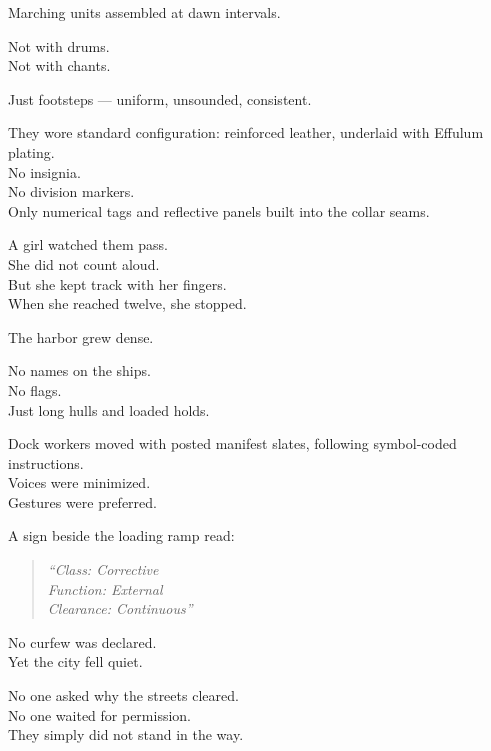 \documentclass[12pt]{article}
\begin{document}
\vspace{1em}

Marching units assembled at dawn intervals.

Not with drums.\\
Not with chants.

Just footsteps — uniform, unsounded, consistent.

They wore standard configuration: reinforced leather, underlaid with Effulum plating.\\
No insignia.\\
No division markers.\\
Only numerical tags and reflective panels built into the collar seams.

\vspace{1em}

A girl watched them pass.\\
She did not count aloud.\\
But she kept track with her fingers.\\
When she reached twelve, she stopped.

\vspace{1em}

The harbor grew dense.

No names on the ships.\\
No flags.\\
Just long hulls and loaded holds.

Dock workers moved with posted manifest slates, following symbol-coded instructions.\\
Voices were minimized.\\
Gestures were preferred.

A sign beside the loading ramp read:

\begin{quote}
\textit{“Class: Corrective\\
Function: External\\
Clearance: Continuous”}
\end{quote}

\vspace{1em}

No curfew was declared.\\
Yet the city fell quiet.

No one asked why the streets cleared.\\
No one waited for permission.\\
They simply did not stand in the way.

\vspace{1em}
\end{document}
